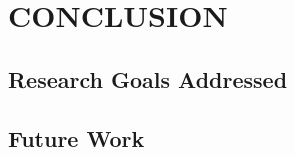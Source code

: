 \fancyhead[RO,LE]{\thepage}
\fancyfoot{} 
\chapter{CONCLUSION}
\section{Research Goals Addressed}
\section{Future Work}
